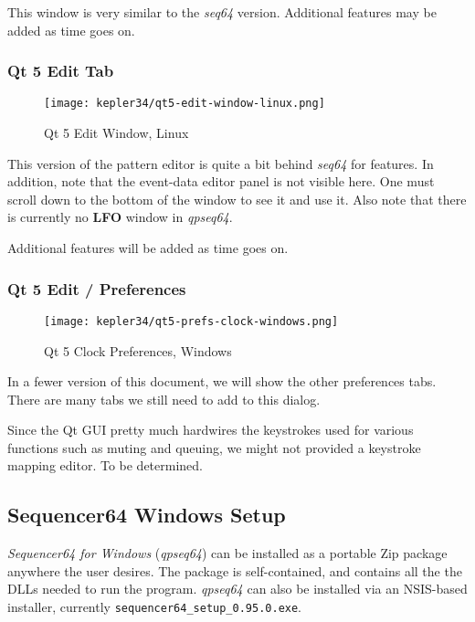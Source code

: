    This window is very similar to the \textsl{seq64} version.
   Additional features may be added as time goes on.

\subsubsection{Qt 5 Edit Tab}
\label{subsubsec:qt_portmidi_qt5_edit_tab}

\begin{figure}[H]
   \centering 
   \texttt{[image: kepler34/qt5-edit-window-linux.png]}
   \caption{Qt 5 Edit Window, Linux}
   \label{fig:qt5_edit_window_linux}
\end{figure}

   This version of the pattern editor is quite a bit behind
   \textsl{seq64} for features.
   In addition, note that the event-data editor panel is not visible here.
   One must scroll down to the bottom of the window to see it and use it.
   Also note that there is currently no \textbf{LFO} window in
   \textsl{qpseq64}.
   
   Additional features will be added as time goes on.

\subsubsection{Qt 5 Edit / Preferences}
\label{subsubsec:qt_portmidi_qt5_edit_prefs}

\begin{figure}[H]
   \centering 
   \texttt{[image: kepler34/qt5-prefs-clock-windows.png]}
   \caption{Qt 5 Clock Preferences, Windows}
   \label{fig:qt5_prefs_clock_windows}
\end{figure}

   In a fewer version of this document, we will show the other preferences
   tabs.  There are many tabs we still need to add to this dialog.

   Since the Qt GUI pretty much hardwires the keystrokes used for various
   functions such as muting and queuing, we might not provided a keystroke
   mapping editor.  To be determined.

\subsection{Sequencer64 Windows Setup}
\label{subsec:qt_portmidi_windows_setup}

   \textsl{Sequencer64 for Windows} (\textsl{qpseq64}) can be installed
   as a portable Zip package anywhere the user desires.  The package is
   self-contained, and contains all the the DLLs needed to run the program.
   \textsl{qpseq64} can also be installed via an NSIS-based installer,
   currently \texttt{sequencer64\_setup\_0.95.0.exe}.

